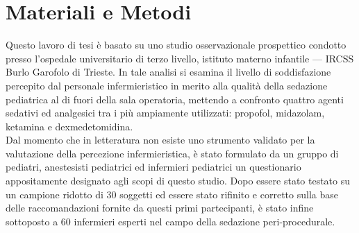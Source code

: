 \chapter{Materiali e Metodi}

Questo lavoro di tesi è basato su uno studio osservazionale prospettico condotto presso l'ospedale universitario di terzo livello, istituto materno infantile --- IRCSS Burlo Garofolo di Trieste. In tale analisi si esamina il livello di soddisfazione percepito dal personale infermieristico in merito alla qualità della sedazione pediatrica al di fuori della sala operatoria, mettendo a confronto quattro agenti sedativi ed analgesici tra i più ampiamente utilizzati: propofol, midazolam, ketamina e dexmedetomidina. 
\\Dal momento che in letteratura non esiste uno strumento validato per la valutazione della percezione infermieristica, è stato formulato da un gruppo di pediatri, anestesisti pediatrici ed infermieri pediatrici un questionario appositamente designato agli scopi di questo studio. Dopo essere stato testato su un campione ridotto di 30 soggetti ed essere stato rifinito e corretto sulla base delle raccomandazioni fornite da questi primi partecipanti, è stato infine sottoposto a 60 infermieri esperti nel campo della sedazione peri-procedurale.



